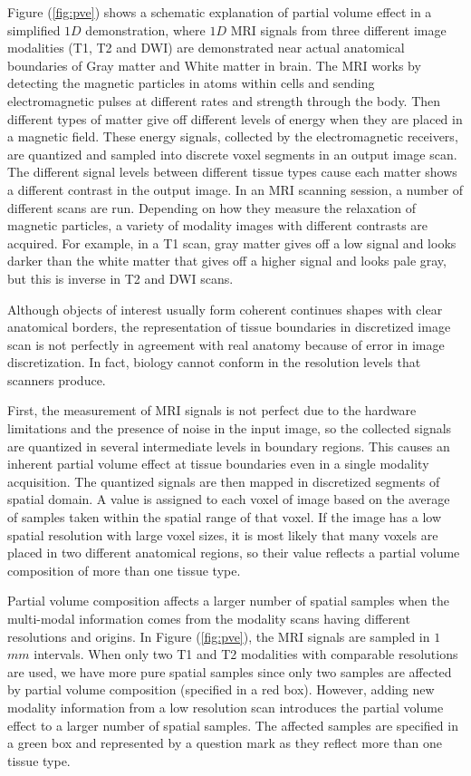 Figure (\ref{fig:pve}) shows a schematic explanation of partial volume effect in a simplified $1D$ demonstration, where $1D$ MRI signals from three different image modalities (T1, T2 and DWI) are demonstrated near actual anatomical boundaries of Gray matter and White matter in brain.
The MRI works by detecting the magnetic particles in atoms within cells and sending electromagnetic pulses at different rates and strength through the body. Then different types of matter give off different levels of energy when they are placed in a magnetic field. These energy signals, collected by the electromagnetic receivers, are quantized and sampled into discrete voxel segments in an output image scan. The different signal levels between different tissue types cause each matter shows a different contrast in the output image. In an MRI scanning session, a number of different scans are run. Depending on how they measure the relaxation of magnetic particles, a variety of modality images with different contrasts are acquired. For example, in a T1 scan, gray matter gives off a low signal and looks darker than the white matter that gives off a higher signal and looks pale gray, but this is inverse in T2 and DWI scans.

Although objects of interest usually form coherent continues shapes with clear anatomical borders, the representation of tissue boundaries in discretized image scan is not perfectly in agreement with real anatomy because of error in image discretization. In fact, biology cannot conform in the resolution levels that scanners produce.

First, the measurement of MRI signals is not perfect due to the hardware limitations and the presence of noise in the input image, so the collected signals are quantized in several intermediate levels in boundary regions. This causes an inherent partial volume effect at tissue boundaries even in a single modality acquisition.
The quantized signals are then mapped in discretized segments of spatial domain. A value is assigned to each voxel of image based on the average of samples taken within the spatial range of that voxel.
If the image has a low spatial resolution with large voxel sizes, it is most likely that many voxels are placed in two different anatomical regions, so their value reflects a partial volume composition of more than one tissue type.

Partial volume composition affects a larger number of spatial samples when the multi-modal information comes from the modality scans having different resolutions and origins.
In Figure (\ref{fig:pve}), the MRI signals are sampled in $1$ $mm$ intervals.
When only two T1 and T2 modalities with comparable resolutions are used, we have more pure spatial samples since only two samples are affected by partial volume composition (specified in a red box).
However, adding new modality information from a low resolution scan introduces the partial volume effect to a larger number of spatial samples. The affected samples are specified in a green box and represented by a question mark as they reflect more than one tissue type.

